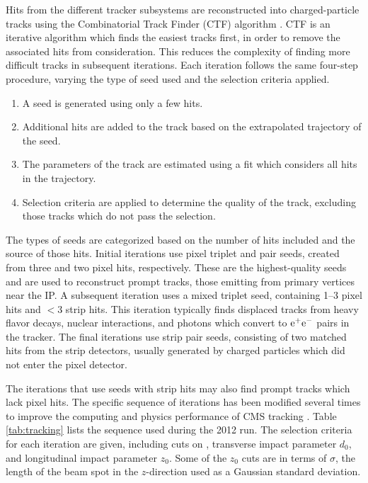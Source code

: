 \documentclass[12pt]{thesis}  %
\newcommand{\Pep}{\ensuremath{\cmsSymbolFace{e}^{+}}\xspace}
\newcommand{\Pem}{\ensuremath{\cmsSymbolFace{e}^{-}}\xspace}
\newcommand{\EpEm}{\ensuremath{\Pep\Pem}}%
\begin{document}
Hits from the different tracker subsystems are reconstructed into charged-particle tracks using the Combinatorial Track Finder (CTF) algorithm \cite{TrackingJINST}. CTF is an iterative algorithm which finds the easiest tracks first, in order to remove the associated hits from consideration. This reduces the complexity of finding more difficult tracks in subsequent iterations. Each iteration follows the same four-step procedure, varying the type of seed used and the selection criteria applied.
\begin{enumerate}
\item A seed is generated using only a few hits.
\item Additional hits are added to the track based on the extrapolated trajectory of the seed.
\item The parameters of the track are estimated using a fit which considers all hits in the trajectory.
\item Selection criteria are applied to determine the quality of the track, excluding those tracks which do not pass the selection.
\end{enumerate}

The types of seeds are categorized based on the number of hits included and the source of those hits. Initial iterations use pixel triplet and pair seeds, created from three and two pixel hits, respectively. These are the highest-quality seeds and are used to reconstruct prompt tracks, those emitting from primary vertices near the IP. A subsequent iteration uses a mixed triplet seed, containing 1--3 pixel hits and ${<}3$ strip hits. This iteration typically finds displaced tracks from heavy flavor decays, nuclear interactions, and photons which convert to \EpEm\xspace pairs in the tracker. The final iterations use strip pair seeds, consisting of two matched hits from the strip detectors, usually generated by charged particles which did not enter the pixel detector.

The iterations that use seeds with strip hits may also find prompt tracks which lack pixel hits. The specific sequence of iterations has been modified several times to improve the computing and physics performance of CMS tracking \cite{Tracking2012}. Table \ref{tab:tracking} lists the sequence used during the 2012 run. The selection criteria for each iteration are given, including cuts on \pt, transverse impact parameter $d_0$, and longitudinal impact parameter $z_0$. Some of the $z_0$ cuts are in terms of $\sigma$, the length of the beam spot in the $z$-direction used as a Gaussian standard deviation.
\end{document}
